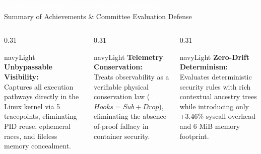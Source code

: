 \documentclass[aspectratio=169,10pt]{beamer}
\begin{document}
{
\begin{frame}[plain]
  \vspace{0.6cm}
  {\LARGE \textbf{\textcolor{white}{ContainerGuard: Proven Runtime Integrity}}}\\[0.2cm]
  {\small \textcolor{gray!40}{Summary of Achievements \& Committee Evaluation Defense}}\\[0.5cm]

  \begin{columns}[T]
    \begin{column}{0.31\textwidth}
      \begin{beamercolorbox}[wd=\textwidth,rounded=true]{navyLight}
        \scriptsize \textbf{\textcolor{blueAccent}{Unbypassable Visibility:}}\\[0.1cm]
        \tiny \textcolor{gray!20}{Captures all execution pathways directly in the Linux kernel via 5 tracepoints, eliminating PID reuse, ephemeral races, and fileless memory concealment.}
      \end{beamercolorbox}
    \end{column}

    \begin{column}{0.31\textwidth}
      \begin{beamercolorbox}[wd=\textwidth,rounded=true]{navyLight}
        \scriptsize \textbf{\textcolor{blueAccent}{Telemetry Conservation:}}\\[0.1cm]
        \tiny \textcolor{gray!20}{Treats observability as a verifiable physical conservation law ($Hooks = Sub + Drop$), eliminating the absence-of-proof fallacy in container security.}
      \end{beamercolorbox}
    \end{column}

    \begin{column}{0.31\textwidth}
      \begin{beamercolorbox}[wd=\textwidth,rounded=true]{navyLight}
        \scriptsize \textbf{\textcolor{blueAccent}{Zero-Drift Determinism:}}\\[0.1cm]
        \tiny \textcolor{gray!20}{Evaluates deterministic security rules with rich contextual ancestry trees while introducing only +3.46\% syscall overhead and 6 MiB memory footprint.}
      \end{beamercolorbox}
    \end{column}
  \end{columns}


\end{frame}}
\end{document}
